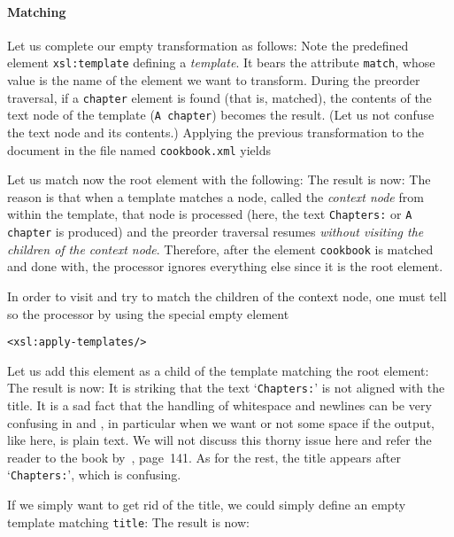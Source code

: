 \paragraph{Matching}
\label{par:matching}

Let us complete our empty transformation as follows:
\noindent Note the predefined element \texttt{xsl:template} defining a
\emph{template}. It bears the attribute \texttt{match}, whose value is
the name of the element we want to transform. During the preorder
traversal, if a \texttt{chapter} element is found (that is, matched),
the contents of the text node of the template (\texttt{A chapter})
becomes the result. (Let us not confuse the text node and its
contents.) Applying the previous transformation to the document in the
file named \texttt{cookbook.xml} yields

\noindent Let us match now the root element with the following:
\noindent The result is now:
\noindent The reason is that when a template matches a node, called
the \emph{context node} from within the template, that node is
processed (here, the text \texttt{Chapters:} or \texttt{A chapter} is
produced) and the preorder traversal resumes \emph{without visiting the
  children of the context node}. Therefore, after the element
\texttt{cookbook} is matched and done with, the \XSLT processor
ignores every\-thing else since it is the root element.

In order to visit and try to match the children of the context node,
one must tell so the processor by using the special empty element
\begin{verbatim}
<xsl:apply-templates/>
\end{verbatim}
Let us add this element as a child of the template matching the root
element: 
\noindent The result is now:
\noindent It is striking that the text `\texttt{Chapters:}' is not
aligned with the title. It is a sad fact that the handling of
whitespace and newlines can be very confusing in \XML and \XSLT, in
particular when we want or not some space if the output, like here, is
plain text. We will not discuss this thorny issue here and refer the
reader to the book by~\cite{Kay_2008}, page~141. As for the rest, the
title appears after `\texttt{Chapters:}', which is confusing.

If we simply want to get rid of the title, we could simply define an
empty template matching \texttt{title}:
\noindent The result is now:


